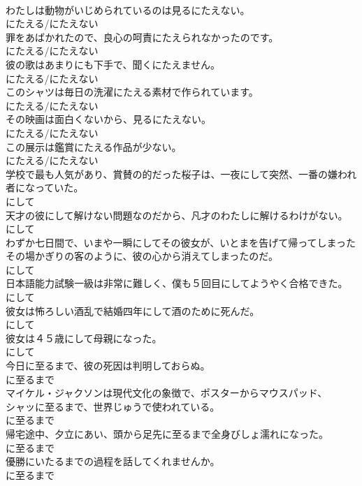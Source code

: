 \documentclass[8pt]{extreport}
\begin{document}
\begin{CJK}{UTF8}{min}
\\	わたしは動物がいじめられているのは見るにたえない。	
\\	にたえる/にたえない
\\	罪をあばかれたので、良心の呵責にたえられなかったのです。	
\\	にたえる/にたえない
\\	彼の歌はあまりにも下手で、聞くにたえません。	
\\	にたえる/にたえない
\\	このシャツは毎日の洗濯にたえる素材で作られています。	
\\	にたえる/にたえない
\\	その映画は面白くないから、見るにたえない。	
\\	にたえる/にたえない
\\	この展示は鑑賞にたえる作品が少ない。	
\\	にたえる/にたえない
\\	学校で最も人気があり、賞賛の的だった桜子は、一夜にして突然、一番の嫌われ者になっていた。	
\\	にして
\\	天才の彼にして解けない問題なのだから、凡才のわたしに解けるわけがない。	
\\	にして
\\	わずか七日間で、いまや一瞬にしてその彼女が、いとまを告げて帰ってしまったその場かぎりの客のように、彼の心から消えてしまったのだ。	
\\	にして
\\	日本語能力試験一級は非常に難しく、僕も５回目にしてようやく合格できた。	
\\	にして
\\	彼女は怖ろしい酒乱で結婚四年にして酒のために死んだ。	
\\	にして
\\	彼女は４５歳にして母親になった。	
\\	にして
\\	今日に至るまで、彼の死因は判明しておらぬ。	
\\	に至るまで
\\	マイケル・ジャクソンは現代文化の象徴で、ポスターからマウスパッド、
\\	シャッに至るまで、世界じゅうで使われている。	
\\	に至るまで
\\	帰宅途中、夕立にあい、頭から足先に至るまで全身びしょ濡れになった。	
\\	に至るまで
\\	優勝にいたるまでの過程を話してくれませんか。	
\\	に至るまで

\end{CJK}
\end{document}
